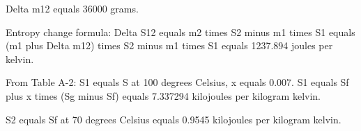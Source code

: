 Delta m12 equals 36000 grams.  

Entropy change formula:  
Delta S12 equals m2 times S2 minus m1 times S1 equals (m1 plus Delta m12) times S2 minus m1 times S1 equals 1237.894 joules per kelvin.  

From Table A-2:  
S1 equals S at 100 degrees Celsius, x equals 0.007.  
S1 equals Sf plus x times (Sg minus Sf) equals 7.337294 kilojoules per kilogram kelvin.  

S2 equals Sf at 70 degrees Celsius equals 0.9545 kilojoules per kilogram kelvin.